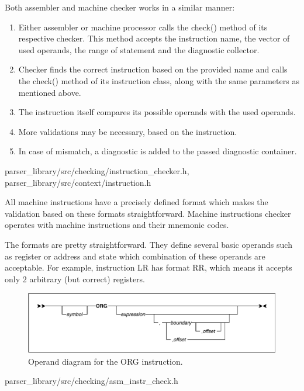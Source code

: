 Both assembler and machine checker works in a similar manner:
\begin{enumerate}
	\item Either assembler or machine processor calls the check() method of its respective checker. This method accepts the instruction name, the vector of used operands, the range of statement and the diagnostic collector.
	\item Checker finds the correct instruction based on the provided name and calls the check() method of its instruction class, along with the same parameters as mentioned above.
	\item The instruction itself compares its possible operands with the used operands.
	\item More validations may be necessary, based on the instruction.
	\item In case of mismatch, a diagnostic is added to the passed diagnostic container.
\end{enumerate}

{parser\_library/src/checking/instruction\_checker.h,
parser\_library/src/context/instruction.h}

All machine instructions have a precisely defined format which makes the validation based on these formats straightforward. Machine instructions checker operates with machine instructions and their mnemonic codes.

The formats are pretty straightforward. They define several basic operands such as register or address and state which combination of these operands are acceptable. For example, instruction LR has format RR, which means it accepts only 2 arbitrary (but correct) registers. 

\begin{figure}
	\centering
	\includegraphics[width=\textwidth]{img/org_diagram}
	\caption{Operand diagram for the ORG instruction.}
	
	\label{fig01:check}
\end{figure}

{parser\_library/src/checking/asm\_instr\_check.h}
\label{sub:asm_check}

